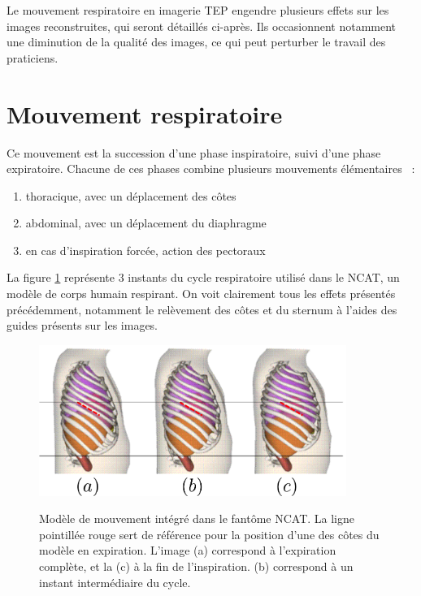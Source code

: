 Le mouvement respiratoire en imagerie TEP engendre plusieurs effets sur les images reconstruites, qui seront détaillés ci-après. Ils occasionnent notamment une diminution de la qualité des images, ce qui peut perturber le travail des praticiens.

\section{Mouvement respiratoire}

Ce mouvement est la succession d'une phase inspiratoire, suivi d'une phase expiratoire. Chacune de ces phases combine plusieurs mouvements élémentaires~\cite{servant2007cours} :
 
\begin{enumerate}
 \item thoracique, avec un déplacement des côtes
 \item abdominal, avec un déplacement du diaphragme
 \item en cas d'inspiration forcée, action des pectoraux
\end{enumerate}

La figure \ref{fig:respiXCAT} représente 3 instants du cycle respiratoire utilisé dans le NCAT, un modèle de corps humain respirant. On voit clairement tous les effets présentés précédemment, notamment le relèvement des côtes et du sternum à l'aides des guides présents sur les images.

\begin{figure}[h!]
    \begin{center}
            \includegraphics[width=10cm]{images/mvtRespi} \\
    \end{center}
    \caption{Modèle de mouvement intégré dans le fantôme NCAT. La ligne pointillée rouge sert de référence pour la position d'une des côtes du modèle en expiration. L'image (a) correspond à l'expiration complète, et la (c) à la fin de l'inspiration. (b) correspond à un instant intermédiaire du cycle. }
    \label{fig:respiXCAT}
\end{figure}



